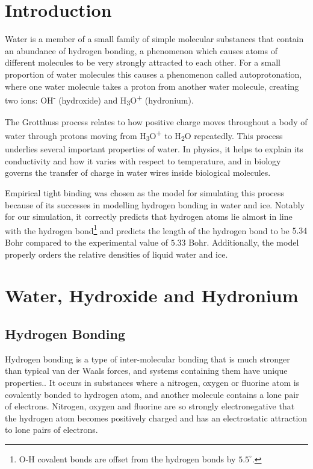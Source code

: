 \documentclass{article}
\begin{document}
\begin{multicols}{2}
\section{Introduction}

Water is a member of a small family of simple molecular substances that contain an abundance of hydrogen bonding, a phenomenon which causes atoms of different molecules to be very strongly attracted to each other. For a small proportion of water molecules this causes a phenomenon called autoprotonation, where one water molecule takes a proton from another water molecule, creating two ions: OH\textsuperscript{-} (hydroxide) and H\textsubscript{3}O\textsuperscript{+} (hydronium). 

The Grotthuss process relates to how positive charge moves throughout a body of water through protons moving from H\textsubscript{3}O\textsuperscript{+} to H\textsubscript{2}O repeatedly. This process underlies several important properties of water. In physics, it helps to explain its conductivity and how it varies with respect to temperature, and in biology governs the transfer of charge in water wires inside biological molecules.\cite{pomes1996structure}

Empirical tight binding was chosen as the model for simulating this process because of its successes in modelling hydrogen bonding in water and ice.\cite{Lozovoi2014} Notably for our simulation, it correctly predicts that hydrogen atoms lie almost in line with the hydrogen bond\footnote{O-H covalent bonds are offset from the hydrogen bonds by $5.5^{\circ}$.} and predicts the length of the hydrogen bond to be $5.34$ Bohr compared to the experimental value of $5.33$ Bohr.\cite{Lozovoi2014} Additionally, the model properly orders the relative densities of liquid water and ice. 

\section{Water, Hydroxide and Hydronium}
\subsection{Hydrogen Bonding}

Hydrogen bonding is a type of inter-molecular bonding that is much stronger than typical van der Waals forces, and systems containing them have unique properties.. It occurs in substances where a nitrogen, oxygen or fluorine atom is covalently bonded to hydrogen atom, and another molecule contains a lone pair of electrons. Nitrogen, oxygen and fluorine are so strongly electronegative that the hydrogen atom becomes positively charged and has an electrostatic attraction to lone pairs of electrons. 


\end{multicols}
\end{document}
